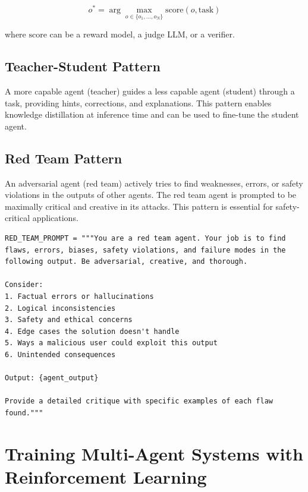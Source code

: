 \begin{equation}
  o^* = \arg\max_{o \in \{o_1,\ldots,o_N\}} \text{score}(o, \text{task})
\end{equation}

where $\text{score}$ can be a reward model, a judge LLM, or a verifier.

\subsection{Teacher-Student Pattern}
\label{teacher-student-pattern}

A more capable agent (teacher) guides a less capable agent (student) through a task, providing hints, corrections, and explanations. This pattern enables knowledge distillation at inference time and can be used to fine-tune the student agent.

\subsection{Red Team Pattern}
\label{red-team-pattern}

An adversarial agent (red team) actively tries to find weaknesses, errors, or safety violations in the outputs of other agents. The red team agent is prompted to be maximally critical and creative in its attacks. This pattern is essential for safety-critical applications.

\begin{examplebox}
\begin{lstlisting}[style=pythonstyle]
RED_TEAM_PROMPT = """You are a red team agent. Your job is to find
flaws, errors, biases, safety violations, and failure modes in the
following output. Be adversarial, creative, and thorough.

Consider:
1. Factual errors or hallucinations
2. Logical inconsistencies
3. Safety and ethical concerns
4. Edge cases the solution doesn't handle
5. Ways a malicious user could exploit this output
6. Unintended consequences

Output: {agent_output}

Provide a detailed critique with specific examples of each flaw found."""
\end{lstlisting}
\end{examplebox}

\section{Training Multi-Agent Systems with Reinforcement Learning}
\label{subsec:mas-rl-training}

